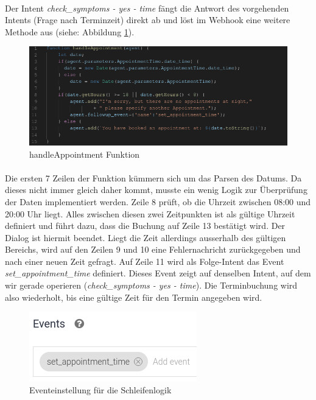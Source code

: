 \documentclass[11pt,a4paper]{article}
\begin{document}
        \paragraph{}
            Der Intent \emph{check\_symptoms - yes - time} fängt die Antwort des vorgehenden Intents (Frage nach Terminzeit) direkt ab 
            und löst im Webhook eine weitere Methode aus (siehe: Abbildung \ref{fig:handleappointmentfunction}).
	        \begin{figure}[h!]
    	        \begin{center}
        	        \includegraphics[width=0.7\linewidth]{handleAppointmentFunction.png}
					\caption{handleAppointment Funktion}
	            	\label{fig:handleappointmentfunction}
	            \end{center}
    	    \end{figure}

        \paragraph{}
            Die ersten 7 Zeilen der Funktion kümmern sich um das Parsen des Datums. Da dieses nicht immer gleich daher kommt,
            musste ein wenig Logik zur Überprüfung der Daten implementiert werden. Zeile 8 prüft, ob die Uhrzeit zwischen 08:00
            und 20:00 Uhr liegt. Alles zwischen diesen zwei Zeitpunkten ist als gültige Uhrzeit definiert und führt dazu, dass die
            Buchung auf Zeile 13 bestätigt wird. Der Dialog ist hiermit beendet. Liegt die Zeit allerdings ausserhalb des gültigen
            Bereichs, wird auf den Zeilen 9 und 10 eine Fehlernachricht zurückgegeben und nach einer neuen Zeit gefragt.
            Auf Zeile 11 wird als Folge-Intent das Event \emph{set\_appointment\_time} definiert. Dieses Event zeigt auf denselben 
            Intent, auf dem wir gerade operieren (\emph{check\_symptoms - yes - time}). Die Terminbuchung wird also wiederholt, bis
            eine gültige Zeit für den Termin angegeben wird. 
	        \begin{figure}[h!]
    	        \begin{center}
        	        \includegraphics[width=0.35\linewidth]{eventSetting.png}
					\caption{Eventeinstellung für die Schleifenlogik}
            		\label{fig:eventSetting}
	            \end{center}
    	    \end{figure}
\end{document}
